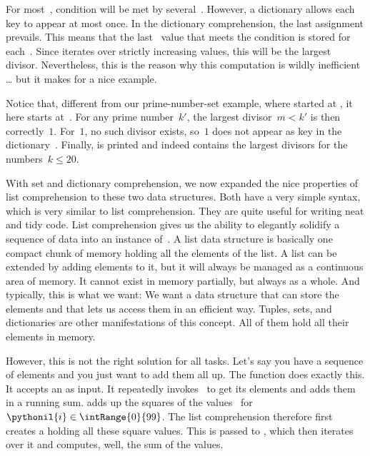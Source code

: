 For most~, condition will be met by several~.
However, a dictionary allows each key to appear at most once.
In the dictionary comprehension, the last assignment prevails.
This means that the last~ value that meets the condition is stored for each~.
Since  iterates over strictly increasing values, this will be the largest divisor.
Nevertheless, this is the reason why this computation is wildly inefficient {\dots} but it makes for a nice example.

Notice that, different from our prime-number-set example, where  started at , it here  starts at~.
For any prime number~$k'$, the largest divisor~$m<k'$ is then correctly~$1$.
For~$1$, no such divisor exists, so~$1$ does not appear as key in the dictionary~.
Finally,  is printed and indeed contains the largest divisors for the numbers~$k\leq20$.

With set and dictionary comprehension, we now expanded the nice properties of list comprehension to these two data structures.
Both have a very simple syntax, which is very similar to list comprehension.
They are quite useful for writing neat and tidy code.%
\FloatBarrier%
\endhsection%
%
%
\label{sec:generatorExpressions}%
%
List comprehension gives us the ability to elegantly solidify a sequence of data into an instance of~.
A list data structure is basically one compact chunk of memory holding all the elements of the list.
A list can be extended by adding elements to it, but it will always be managed as a continuous area of memory.
It cannot exist in memory partially, but always as a whole.
And typically, this is what we want:
We want a data structure that can store the elements and that lets us access them in an efficient way.
Tuples, sets, and dictionaries are other manifestations of this concept.
All of them hold all their elements in memory.

However, this is not the right solution for all tasks.
Let's say you have a sequence of elements and you just want to add them all up.
The  function does exactly this.
It accepts an  as input.
It repeatedly invokes~ to get its elements and adds them in a running sum.
 adds up the squares of the values~ for~$\pythonil{i}\in\intRange{0}{99}$.
The list comprehension therefore first creates a  holding all these square values.
This  is passed to , which then iterates over it and computes, well, the sum of the values.

